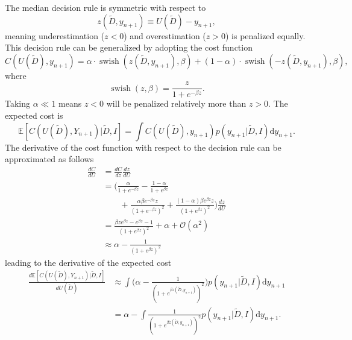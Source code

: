 \begin{example}
	The median decision rule is symmetric with respect to
	\begin{equation}
		z(\tilde{D},y_{n+1}) \equiv U(\tilde{D})-y_{n+1},
	\end{equation}
	meaning underestimation ($z<0$) and overestimation ($z>0$) is penalized equally. This decision rule can be generalized by adopting the cost function
	\begin{equation}
		C(U(\tilde{D}), y_{n+1}) = \alpha\cdot \operatorname{swish}(z(\tilde{D},y_{n+1}),\beta)
		+(1-\alpha)\cdot \operatorname{swish}(-z(\tilde{D},y_{n+1}),\beta),
	\end{equation}
	where
	\begin{equation}
		\operatorname{swish}(z,\beta) = \frac{z}{1+e^{-\beta z}}.
	\end{equation}
	Taking $\alpha \ll 1$ means $z<0$ will be penalized relatively more than $z>0$. The expected cost is
	\begin{equation}
		\mathbb{E}[C(U(\tilde{D}), Y_{n+1})|\tilde{D},I] = \int C(U(\tilde{D}),y_{n+1}) p(y_{n+1}|\tilde{D},I)\mathrm{d}y_{n+1}.
	\end{equation}
	The derivative of the cost function with respect to the decision rule can be approximated as follows
	\begin{equation}
		\begin{split}
			\frac{dC}{dU} & = \frac{dC}{dz}\frac{dz}{dU}\\
			& = \bigg(\frac{\alpha}{1+e^{-\beta z}}-\frac{1-\alpha}{1+e^{\beta z}}\\
			&\qquad+\frac{\alpha\beta e^{-\beta z}z}{(1+e^{-\beta z})^2}+\frac{(1-\alpha)\beta e^{\beta z}z}{(1+e^{\beta z})^2}\bigg)\frac{dz}{dU}\\
			&= \frac{\beta z e^{\beta z}-e^{\beta z}-1}{(1+e^{\beta z})^2}+\alpha+\mathcal{O}(\alpha^2)\\
			&\approx  \alpha -\frac{1}{(1+e^{\beta z})^2}
		\end{split}
	\end{equation}
	leading to the derivative of the expected cost
	\begin{equation}
		\begin{split}
			\frac{d\mathbb{E}[C(U(\tilde{D}), Y_{n+1})|\tilde{D},I]}{dU(\tilde{D})} &\approx \int \bigg(\alpha -\frac{1}{(1+e^{\beta z(\tilde{D},y_{n+1})})^2}\bigg)p(y_{n+1}|\tilde{D},I) \mathrm{d}y_{n+1}\\
			& = \alpha -\int \frac{1}{(1+e^{\beta z(\tilde{D},y_{n+1})})^2}p(y_{n+1}|\tilde{D},I) \mathrm{d} y_{n+1}.\\

\end{split}
\end{equation}
\end{example}
